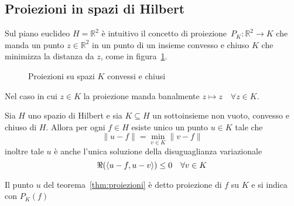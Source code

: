 \subsection{Proiezioni in spazi di Hilbert}

Sul piano euclideo \(H = \mathbb{R}^2\) è intuitivo il concetto di
proiezione~\(P_K : \mathbb R^2 \rightarrow K\) che manda un punto \(z\in \mathbb
R^2\) in un punto di un insieme convesso e chiuso \(K\) che minimizza la
distanza da \(z\), come in figura~\ref{fig:teorema-delle-proiezioni}.
\begin{figure}[ht]
    \centering
    \caption{Proiezioni su spazi \(K\) convessi e chiusi}\label{fig:teorema-delle-proiezioni}
\end{figure}
Nel caso in cui \(z \in K\) la proiezione manda banalmente \(z \mapsto z \quad
\forall z \in K\). 

\begin{theorem}\label{thm:proiezioni}
    Sia \(H\) uno spazio di Hilbert e sia \(K \subseteq H \) un sottoinsieme non
    vuoto, convesso e chiuso di \(H\). Allora per ogni \(f \in H\) esiste unico
    un punto \(u \in K\) tale che 
    \begin{equation}\label{eq:PM}
      \|u - f\| = \min_{v \in K} \|v - f\|
    \end{equation}
    inoltre tale \(u\) è anche l'unica soluzione della disuguaglianza
    variazionale 
    \begin{equation}\label{eq:DV}
      \Re({\left\langle u-f, u-v\right\rangle}) \le 0 \quad \forall v \in K
    \end{equation}
\end{theorem}

\begin{definition}[Proiezione]
    Il punto \(u\) del teorema~\ref{thm:proiezioni} è detto proiezione di \(f\)
    su \(K\) e si indica con \(P_{K}{(f)}\)
\end{definition}

